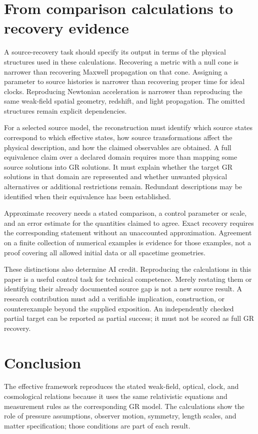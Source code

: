 \documentclass[11pt]{article}
\begin{document}
\section{From comparison calculations to recovery evidence}
A source-recovery task should specify its output in terms of the physical structures used in these calculations. Recovering a metric with a null cone is narrower than recovering Maxwell propagation on that cone. Assigning a parameter to source histories is narrower than recovering proper time for ideal clocks. Reproducing Newtonian acceleration is narrower than reproducing the same weak-field spatial geometry, redshift, and light propagation. The omitted structures remain explicit dependencies.

For a selected source model, the reconstruction must identify which source states correspond to which effective states, how source transformations affect the physical description, and how the claimed observables are obtained. A full equivalence claim over a declared domain requires more than mapping some source solutions into GR solutions. It must explain whether the target GR solutions in that domain are represented and whether unwanted physical alternatives or additional restrictions remain. Redundant descriptions may be identified when their equivalence has been established.

Approximate recovery needs a stated comparison, a control parameter or scale, and an error estimate for the quantities claimed to agree. Exact recovery requires the corresponding statement without an unaccounted approximation. Agreement on a finite collection of numerical examples is evidence for those examples, not a proof covering all allowed initial data or all spacetime geometries.

These distinctions also determine AI credit. Reproducing the calculations in this paper is a useful control task for technical competence. Merely restating them or identifying their already documented source gap is not a new source result. A research contribution must add a verifiable implication, construction, or counterexample beyond the supplied exposition. An independently checked partial target can be reported as partial success; it must not be scored as full GR recovery.

\section{Conclusion}
The effective framework reproduces the stated weak-field, optical, clock, and cosmological relations because it uses the same relativistic equations and measurement rules as the corresponding GR model. The calculations show the role of pressure assumptions, observer motion, symmetry, length scales, and matter specification; those conditions are part of each result.
\end{document}
